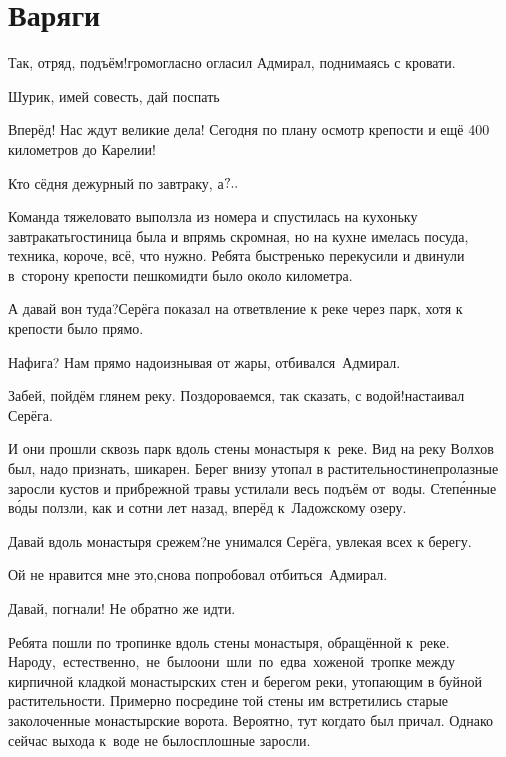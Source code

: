\chapter{Варяги}
\vepsianrose
\fancyhead[LE]{\fancyplain{}{\bfseries \parttitle}}
\fancyhead[RO]{\fancyplain{}{\bfseries \rightmark}}

\diagdash Так, отряд, подъём!\mdash громогласно огласил Адмирал, поднимаясь с кровати.

\diagdash Шурик, имей совесть, дай поспать\myldots{}

\diagdash Вперёд! Нас ждут великие дела! Сегодня по плану осмотр крепости и ещё 400 километров до Карелии!

\diagdash Кто сёдня дежурный по завтраку, а$\quldots$%

Команда тяжеловато выползла из номера и спустилась на кухоньку завтракать\mdash гостиница была и впрямь скромная, но на кухне имелась посуда, техника, короче, всё, что нужно. Ребята быстренько перекусили и двинули в~сторону крепости пешком\mdash идти было около километра.

\diagdash А давай вон туда?\mdash Серёга показал на ответвление к реке через парк, хотя к крепости было прямо.

\diagdash Нафига? Нам прямо надо\myldots{}\mdash изнывая от жары, отбивался~Адмирал.

\diagdash Забей, пойдём глянем реку. Поздороваемся, так сказать, с водой!\mdash настаивал Серёга.

И они прошли сквозь парк вдоль стены монастыря к~реке. Вид на реку Волхов был, надо признать, шикарен. Берег внизу утопал в растительности\mdash непролазные заросли кустов и прибрежной травы устилали весь подъём от~воды. Степ\'{е}нные в\'{о}ды ползли, как и сотни лет назад, вперёд к~Ладожскому озеру.

\diagdash Давай вдоль монастыря срежем?\mdash не унимался Серёга, увлекая всех к берегу.

\diagdash Ой не нравится мне это,\mdash снова попробовал отбиться~Адмирал.

\diagdash Давай, погнали! Не обратно же идти.

Ребята пошли по тропинке вдоль стены монастыря, обращённой к~реке. Народу,~естественно,~не~было\mdash они~шли~по~едва~хоженой~тропке между кирпичной кладкой монастырских стен и берегом реки, утопающим в буйной растительности. Примерно посредине той стены им встретились старые заколоченные монастырские ворота. Вероятно, тут когда\sdash то был причал. Однако сейчас выхода к~воде не было\mdash сплошные заросли. 

